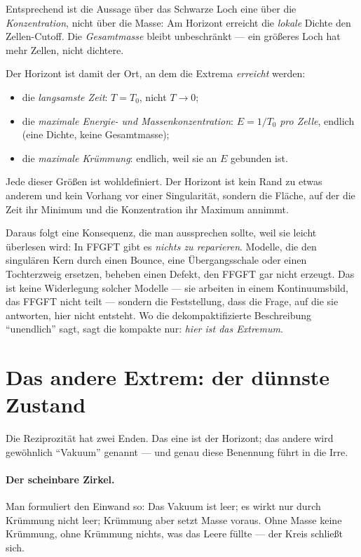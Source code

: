 Entsprechend ist die Aussage über das Schwarze Loch eine über die \emph{Konzentration}, nicht über
die Masse: Am Horizont erreicht die \emph{lokale} Dichte den Zellen-Cutoff. Die \emph{Gesamtmasse}
bleibt unbeschränkt --- ein größeres Loch hat mehr Zellen, nicht dichtere.

Der Horizont ist damit der Ort, an dem die Extrema \emph{erreicht} werden:
\begin{itemize}
\item die \emph{langsamste Zeit}: $T = T_0$, nicht $T \to 0$;
\item die \emph{maximale Energie- und Massenkonzentration}: $E = 1/T_0$ \emph{pro Zelle},
endlich (eine Dichte, keine Gesamtmasse);
\item die \emph{maximale Krümmung}: endlich, weil sie an $E$ gebunden ist.
\end{itemize}
Jede dieser Größen ist wohldefiniert. Der Horizont ist kein Rand zu etwas anderem und kein
Vorhang vor einer Singularität, sondern die Fläche, auf der die Zeit ihr Minimum und die
Konzentration ihr Maximum annimmt.

Daraus folgt eine Konsequenz, die man aussprechen sollte, weil sie leicht überlesen wird: In
FFGFT gibt es \emph{nichts zu reparieren}. Modelle, die den singulären Kern durch einen Bounce,
eine Übergangsschale oder einen Tochterzweig ersetzen, beheben einen Defekt, den FFGFT gar nicht
erzeugt. Das ist keine Widerlegung solcher Modelle --- sie arbeiten in einem Kontinuumsbild, das
FFGFT nicht teilt --- sondern die Feststellung, dass die Frage, auf die sie antworten, hier nicht
entsteht. Wo die dekompaktifizierte Beschreibung \enquote{unendlich} sagt, sagt die kompakte nur:
\emph{hier ist das Extremum}.

\section{Das andere Extrem: der dünnste Zustand}

Die Reziprozität hat zwei Enden. Das eine ist der Horizont; das andere wird gewöhnlich
\enquote{Vakuum} genannt --- und genau diese Benennung führt in die Irre.

\paragraph{Der scheinbare Zirkel.} Man formuliert den Einwand so: Das Vakuum ist leer; es wirkt
nur durch Krümmung nicht leer; Krümmung aber setzt Masse voraus. Ohne Masse keine Krümmung, ohne
Krümmung nichts, was das Leere füllte --- der Kreis schließt sich.

